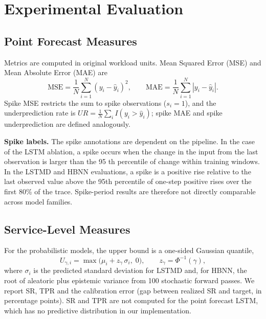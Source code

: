 \documentclass[conference]{IEEEtran}
\begin{document}
\section{Experimental Evaluation}\label{experimental-evaluation}

\subsection{Point Forecast Measures}\label{point-forecast-measures}

Metrics are computed in original workload units. Mean Squared Error (MSE) and
Mean Absolute Error (MAE) are
\begin{equation}
\mathrm{MSE}=\frac{1}{N}\sum_{i=1}^{N}(y_i-\hat{y}_i)^2,\qquad
\mathrm{MAE}=\frac{1}{N}\sum_{i=1}^{N}|y_i-\hat{y}_i|.
\label{eq:mse}
\end{equation}  
Spike MSE restricts the sum to spike observations ($s_i=1$), and the
underprediction rate is $UR=\frac{1}{N}\sum_i I(y_i>\hat{y}_i)$; spike MAE and
spike underprediction are defined analogously.

\textbf{Spike labels.} The spike annotations are dependent on the pipeline. In the case of the LSTM ablation, a spike occurs when the change in the input from the last observation is larger than the 95 th percentile of change within training windows. In the LSTMD and HBNN evaluations, a spike is a positive rise relative
to the last observed value above the 95th percentile of one-step positive rises
over the first 80\% of the trace. Spike-period results are therefore not
directly comparable across model families.

\subsection{Service-Level Measures}\label{service-level-metrics-1}

For the probabilistic models, the upper bound is a one-sided Gaussian quantile,
\begin{equation}
U_{\gamma,i}=\max\!\big(\mu_i+z_\gamma\,\sigma_i,\;0\big),\qquad z_\gamma=\Phi^{-1}(\gamma),
\end{equation}
where $\sigma_i$ is the predicted standard deviation for LSTMD and, for HBNN,
the root of aleatoric plus epistemic variance from 100 stochastic forward
passes. We report SR, TPR and the calibration error (gap between realized SR and
target, in percentage points). SR and TPR are not computed for the point
forecast LSTM, which has no predictive distribution in our implementation.
\end{document}
